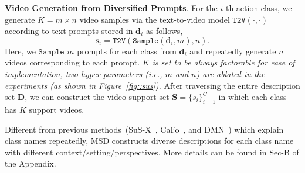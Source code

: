 {
\noindent\textbf{Video Generation from Diversified Prompts}.
For the $i$-th action class, we generate $K=m \times n$ video samples via the text-to-video model $\texttt{T2V}(\cdot, \cdot)$ according to text prompts stored in $\bm d_{i}$ as follows, 
\begin{equation}
\bm{s}_i = \texttt{T2V}(\texttt{Sample}(\bm{d}_i, m), n).\label{eq::MSD}
\end{equation}
Here, we $\texttt{Sample}$ $m$ prompts for each class from $\bm{d}_i$ and repeatedly generate $n$ videos corresponding to each prompt. \textit{$K$ is set to be always factorable for ease of implementation, {two hyper-parameters (\emph{\textit{i.e.}}, $m$ and $n$) are ablated in the experiments (as shown in Figure~\ref{fig::sus})}.} After traversing the entire description set $\bm{D}$, we can construct the video support-set $\bm{S}=\{s_{i}\}_{i=1}^{C}$ in which each class has $K$ support videos.
}

{
Different from previous methods~(SuS-X~\cite{udandarao2022sus-x}, CaFo~\cite{zhang2023prompt}, and DMN~\cite{zhang2024dual}) which explain class names repeatedly, MSD constructs diverse descriptions for each class name with different context/setting/perspectives. More details can be found in Sec-B of the Appendix.
}

